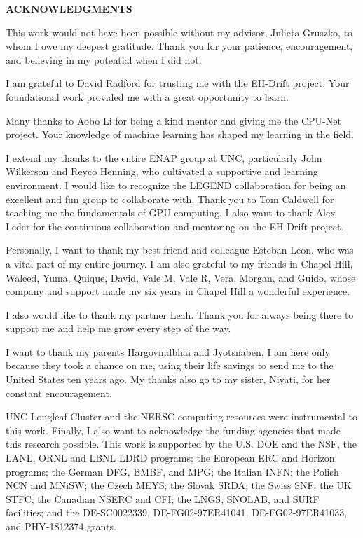 \begin{center}
\vspace*{52pt}
{\normalfont \textbf{ACKNOWLEDGMENTS}}
\end{center}

This work would not have been possible without my advisor, Julieta Gruszko, to whom I owe my deepest gratitude. Thank you for your patience, encouragement, and believing in my potential when I did not.

I am grateful to David Radford for trusting me with the EH-Drift project. Your foundational work provided me with a great opportunity to learn. 

Many thanks to Aobo Li for being a kind mentor and giving me the CPU-Net project. Your knowledge of machine learning has shaped my learning in the field.

I extend my thanks to the entire ENAP group at UNC, particularly John Wilkerson and Reyco Henning, who cultivated a supportive and learning environment. I would like to recognize the LEGEND collaboration for being an excellent and fun group to collaborate with. Thank you to Tom Caldwell for teaching me the fundamentals of GPU computing. I also want to thank Alex Leder for the continuous collaboration and mentoring on the EH-Drift project.

Personally, I want to thank my best friend and colleague Esteban Leon, who was a vital part of my entire journey. I am also grateful to my friends in Chapel Hill, Waleed, Yuma, Quique, David, Vale M, Vale R, Vera, Morgan, and Guido, whose company and support made my six years in Chapel Hill a wonderful experience.

I also would like to thank my partner Leah. Thank you for always being there to support me and help me grow every step of the way.

I want to thank my parents Hargovindbhai and Jyotsnaben. I am here only because they took a chance on me, using their life savings to send me to the United States ten years ago. My thanks also go to my sister, Niyati, for her constant encouragement.

UNC Longleaf Cluster and the NERSC computing resources were instrumental to this work. Finally, I also want to acknowledge the funding agencies that made this research possible. This work is supported by the U.S. DOE and the NSF, the LANL, ORNL and LBNL LDRD programs; the European ERC and Horizon programs; the German DFG, BMBF, and MPG; the Italian INFN; the Polish NCN and MNiSW; the Czech MEYS; the Slovak SRDA; the Swiss SNF; the UK STFC; the Canadian NSERC and CFI; the LNGS, SNOLAB, and SURF facilities; and the DE-SC0022339, DE-FG02-97ER41041, DE-FG02-97ER41033, and PHY-1812374 grants.

\clearpage